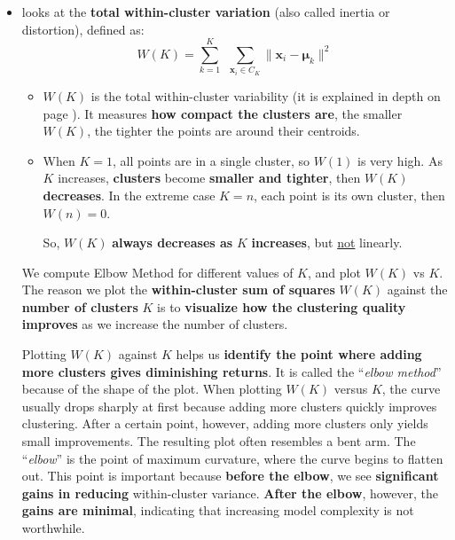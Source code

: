 \begin{itemize}
    \item {} looks at the \textbf{total within-cluster variation} (also called inertia or distortion), defined as:
    \begin{equation}
        W(K) = \displaystyle\sum_{k=1}^{K} \:\: \sum_{\mathbf{x}_{i} \in C_{K}} \| \mathbf{x}_{i} - \mathbf{\mu}_{k} \|^{2}
    \end{equation}
    \begin{itemize}
        \item $W(K)$ is the total within-cluster variability (it is explained in depth on page \pageref{def: within-cluster variability}). It measures \textbf{how compact the clusters are}, the smaller $W(K)$, the tighter the points are around their centroids.
        \item When $K = 1$, all points are in a single cluster, so $W(1)$ is very high. As $K$ increases, \textbf{clusters} become \textbf{smaller and tighter}, then $W(K)$ \textbf{decreases}. In the extreme case $K = n$, each point is its own cluster, then $W(n) = 0$.
        
        So, $W(K)$ \textbf{always decreases as} $K$ \textbf{increases}, but \underline{not} linearly.
    \end{itemize}
    We compute Elbow Method for different values of $K$, and plot $W(K)$ vs $K$. The reason we plot the \textbf{within-cluster sum of squares} $W(K)$ against the \textbf{number of clusters} $K$ is to \textbf{visualize how the clustering quality improves} as we increase the number of clusters.

    Plotting $W(K)$ against $K$ helps us \textbf{identify the point where adding more clusters gives diminishing returns}. It is called the ``\emph{elbow method}'' because of the shape of the plot. When plotting $W(K)$ versus $K$, the curve usually drops sharply at first because adding more clusters quickly improves clustering. After a certain point, however, adding more clusters only yields small improvements. The resulting plot often resembles a bent arm. The ``\emph{elbow}'' is the point of maximum curvature, where the curve begins to flatten out. This point is important because \textbf{before the elbow}, we see \textbf{significant gains in reducing} within-cluster variance. \textbf{After the elbow}, however, the \textbf{gains are minimal}, indicating that increasing model complexity is not worthwhile.


\end{itemize}
